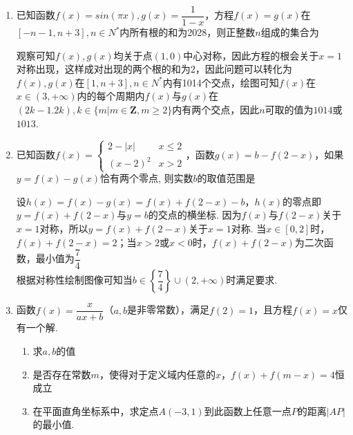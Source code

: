 \begin{enumerate}
    \item 已知函数$f(x) = sin\left(\pi x\right), g(x) = \dfrac{1}{1-x}$，方程$f(x) = g(x)$在$[-n-1, n+3], n \in N^{*}$内所有根的和为2028，则正整数$n$组成的集合为
    \begin{jieda}
        观察可知$f(x), g(x)$均关于点$(1, 0)$中心对称，因此方程的根会关于$x = 1$对称出现，这样成对出现的两个根的和为$2$，因此问题可以转化为$f(x), g(x)$在$[1, n+3], n \in N^{*}$内有1014个交点，绘图可知$f(x)$在$x \in (3, +\infty)$内的每个周期内$f(x)$与$g(x)$在$(2k-1. 2k), k \in \{m | m \in \mathbf{Z}, m \geq 2\}$内有两个交点，因此$n$可取的值为$1014$或$1013$.
    \end{jieda}
    
    \item 已知函数$f(x) = \left \{ \begin{array}{ll}
            2 - |x| & x \leq 2 \\
            (x-2)^2 & x > 2
    \end{array}\right.$，函数$g(x) = b - f(2-x)$，如果$y = f(x) - g(x)$恰有两个零点, 则实数$b$的取值范围是
    \begin{jieda}
        设$h(x) = f(x) - g(x) = f(x) + f(2-x) - b$，$h(x)$的零点即$y = f(x) + f(2-x)$与$y = b$的交点的横坐标. 因为$f(x)$与$f(2-x)$关于$x = 1$对称，所以$y = f(x) + f(2-x)$关于$x = 1$对称. 当$x \in [0, 2]$时，$f(x) + f(2-x) = 2$；当$x > 2$或$x < 0$时，$f(x) + f(2-x)$为二次函数，最小值为$\dfrac{7}{4}$ \\
        根据对称性绘制图像可知当$b \in \left\{\dfrac{7}{4}\right\} \cup (2, +\infty)$时满足要求. 
    \end{jieda}
    
    \item 函数$f(x) = \dfrac{x}{ax+b}$（$a, b$是非零常数），满足$f(2) = 1$，且方程$f(x) = x$仅有一个解.
    \begin{enumerate}
        \item 求$a, b$的值
        \item 是否存在常数$m$，使得对于定义域内任意的$x$，$f(x) + f(m-x) = 4$恒成立
        \item 在平面直角坐标系中，求定点$A(-3, 1)$到此函数上任意一点$P$的距离$|AP|$的最小值.
    \end{enumerate}
    \begin{jieda}
\end{jieda}
\end{enumerate}

